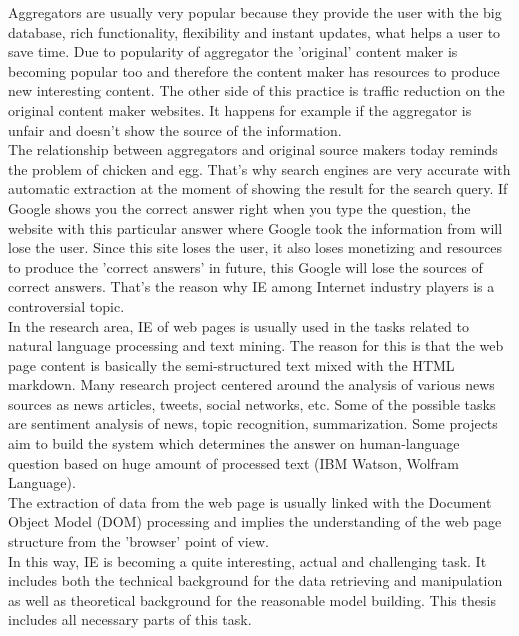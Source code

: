 Aggregators are usually very popular because they provide the user with the big database, rich functionality, flexibility and instant updates, what helps a user to save time. Due to popularity of aggregator the 'original' content maker is becoming popular too and therefore the content maker has resources to produce new interesting content. The other side of this practice is traffic reduction on the original content maker websites. It happens for example if the aggregator is unfair and doesn't show the source of the information. \\

The relationship between aggregators and original source makers today reminds the problem of chicken and egg. That's why search engines are very accurate with automatic extraction at the moment of showing the result for the search query. If Google shows you the correct answer right when you type the question, the website with this particular answer where Google took the information from will lose the user. Since this site loses the user, it also loses monetizing and resources to produce the 'correct answers' in future, this Google will lose the sources of correct answers. That's the reason why IE among Internet industry players is a controversial topic.\\

In the research area, IE of web pages is usually used in the tasks related to natural language processing and text mining. The reason for this is that the web page content is basically the semi-structured text mixed with the HTML markdown. Many research project centered around the analysis of various news sources as news articles, tweets, social networks, etc. Some of the possible tasks are sentiment analysis of news, topic recognition, summarization. Some projects aim to build the system which determines the answer on human-language question based on huge amount of processed text (IBM Watson, Wolfram Language).\\      

The extraction of data from the web page is usually linked with the Document Object Model (DOM) processing and implies the understanding of the web page structure from the 'browser' point of view. \\

In this way, IE is becoming a quite interesting, actual and challenging task. It includes both the technical background for the data retrieving and manipulation as well as theoretical background for the reasonable model building. This thesis includes all necessary parts of this task.

